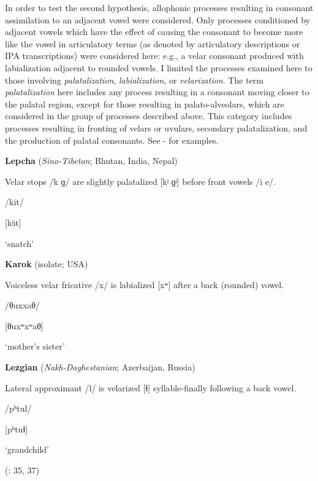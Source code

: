   In order to test the second hypothesis, allophonic processes resulting in consonant assimilation to an adjacent vowel were considered. Only processes conditioned by adjacent vowels which have the effect of causing the consonant to become more like the vowel in articulatory terms (as denoted by articulatory descriptions or IPA transcriptions) were considered here: e.g., a velar consonant produced with labialization adjacent to rounded vowels. I limited the processes examined here to those involving \textit{palatalization}, \textit{labialization}, or \textit{velarization}. The term \textit{palatalization} here includes any process resulting in a consonant moving closer to the palatal region, except for those resulting in palato-alveolars, which are considered in the group of processes described above. This category includes processes resulting in fronting of velars or uvulars, secondary palatalization, and the production of palatal consonants. See - for examples.

\ea\label{ex:(7.6)}
  \textbf{Lepcha} (\textit{Sino-Tibetan}; Bhutan, India, Nepal)

Velar stops /k ɡ/ are slightly palatalized [kʲ ɡʲ] before front vowels /i e/.

/kit/

[kʲit]

\glt ‘snatch’

\citep[21]{Plaisier2007}

\z

\ea\label{ex:(7.7)}
  \textbf{Karok} (isolate; USA)

Voiceless velar fricative /x/ is labialized [xʷ] after a back (rounded) vowel.

/θuxxaθ/

[θuxʷxʷaθ]

\glt ‘mother’s sister’

\citep[8]{Bright1957}

\z

\ea\label{ex:(7.8)}
  \textbf{Lezgian} (\textit{Nakh-Daghestanian}; Azerbaijan, Russia)

Lateral approximant /l/ is velarized [ɫ] syllable-finally following a back vowel.

/pʰtul/

[pʰtuɫ]

\glt ‘grandchild’

(\citealt{Haspelmath1993}: 35, 37)
\z

